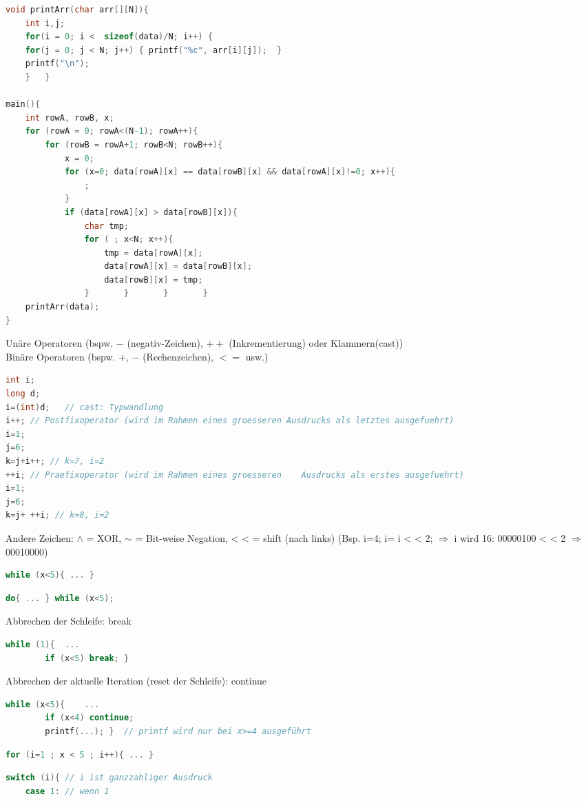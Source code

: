 \begin{multicols*}{3}
\begin{lstlisting}[language=C]
void printArr(char arr[][N]){
	int i,j;
	for(i = 0; i <  sizeof(data)/N; i++) {
    for(j = 0; j < N; j++) { printf("%c", arr[i][j]);  }
    printf("\n");
	}	}

main(){	
	int rowA, rowB, x;
	for (rowA = 0; rowA<(N-1); rowA++){
		for (rowB = rowA+1; rowB<N; rowB++){
			x = 0;
			for (x=0; data[rowA][x] == data[rowB][x] && data[rowA][x]!=0; x++){
				;			
			}
			if (data[rowA][x] > data[rowB][x]){
				char tmp;
				for ( ; x<N; x++){
					tmp = data[rowA][x];
					data[rowA][x] = data[rowB][x];
					data[rowB][x] = tmp;
				}		}		}		}
	printArr(data);
}
\end{lstlisting}
\HRule[4pt]
Unäre Operatoren (bspw. $-$ (negativ-Zeichen), $++$ (Inkrementierung) oder Klammern(cast))\\
Binäre Operatoren (bspw. $+$, $-$ (Rechenzeichen), $<=$ usw.)
\begin{lstlisting}[language=C]
int i;
long d;
i=(int)d;	// cast: Typwandlung
i++; // Postfixoperator (wird im Rahmen eines groesseren Ausdrucks als letztes ausgefuehrt)
i=1;
j=6;
k=j+i++; // k=7, i=2
++i; // Praefixoperator (wird im Rahmen eines groesseren 	Ausdrucks als erstes ausgefuehrt)
i=1;
j=6;
k=j+ ++i; // k=8, i=2
\end{lstlisting}
Andere Zeichen: $\wedge$ = XOR, $\sim$ = Bit-weise Negation, <\! < = shift (nach links) (Bsp. i=4; i= i <\! < 2; $\Rightarrow$ i wird 16: 00000100 <\! < 2 $\Rightarrow$ 00010000)
\HRule[4pt]
\begin{lstlisting}[language=C]
	while (x<5){ ... }
\end{lstlisting}
\HDRule[4pt]
\begin{lstlisting}[language=C]
	do{	...	} while (x<5);
\end{lstlisting}
Abbrechen der Schleife: break
\begin{lstlisting}[language=C]
	while (1){	...
		if (x<5) break; }
\end{lstlisting}
Abbrechen der aktuelle Iteration (reset der Schleife): continue
\begin{lstlisting}[language=C]
	while (x<5){	...	
		if (x<4) continue;
		printf(...); }	// printf wird nur bei x>=4 ausgeführt
\end{lstlisting}
\HDRule[4pt]
\begin{lstlisting}[language=C]
	for (i=1 ; x < 5 ; i++){ ... }
\end{lstlisting}
\HDRule[4pt]
\begin{lstlisting}[language=C]
switch (i){ // i ist ganzzahliger Ausdruck
	case 1:	// wenn 1

\end{lstlisting}
\end{multicols*}
